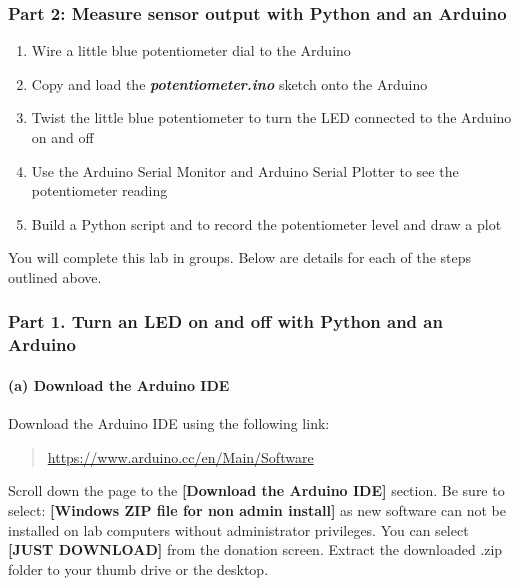     \hypertarget{part-2-measure-sensor-output-with-python-and-an-arduino}{%
\subsubsection{Part 2: Measure sensor output with Python and an
Arduino}\label{part-2-measure-sensor-output-with-python-and-an-arduino}}

\begin{enumerate}
\def\labelenumi{(\alph{enumi})}
\item
  Wire a little blue potentiometer dial to the Arduino
\item
  Copy and load the \textbf{\emph{potentiometer.ino}} sketch onto the
  Arduino
\item
  Twist the little blue potentiometer to turn the LED connected to the
  Arduino on and off
\item
  Use the Arduino Serial Monitor and Arduino Serial Plotter to see the
  potentiometer reading
\item
  Build a Python script and to record the potentiometer level and draw a
  plot
\end{enumerate}

    You will complete this lab in groups. Below are details for each of the
steps outlined above.

\newpage

\hypertarget{part-1.-turn-an-led-on-and-off-with-python-and-an-arduino}{%
\subsubsection{Part 1. Turn an LED on and off with Python and an
Arduino}\label{part-1.-turn-an-led-on-and-off-with-python-and-an-arduino}}

    \hypertarget{a-download-the-arduino-ide}{%
\paragraph{(a) Download the Arduino
IDE}\label{a-download-the-arduino-ide}}

Download the Arduino IDE using the following link:

\begin{quote}
\href{https://www.arduino.cc/en/Main/Software}{https://www.arduino.cc/en/Main/Software}
\end{quote}

Scroll down the page to the \textbf{{[}Download the Arduino IDE{]}}
section. Be sure to select: \textbf{{[}Windows ZIP file for non admin install{]}} 
as new software can not be installed on lab computers
without administrator privileges. You can select \textbf{{[}JUST
DOWNLOAD{]}} from the donation screen. Extract the downloaded .zip
folder to your thumb drive or the desktop.

